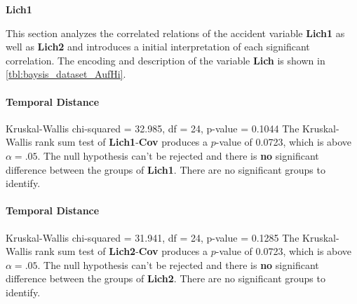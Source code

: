 \Large
\centerline{\textbf{Lich1}}
\normalsize
This section analyzes the correlated relations of the accident variable \textbf{Lich1} as well as \textbf{Lich2} and introduces a initial interpretation of each significant correlation. The encoding and description of the variable \textbf{Lich} is shown in \cref{tbl:baysis_dataset_AufHi}.

\paragraph{Temporal Distance}
Kruskal-Wallis chi-squared = 32.985, df = 24, p-value = 0.1044
The Kruskal-Wallis rank sum test of \textbf{Lich1}-\textbf{Cov} produces a $p$-value of 0.0723, which is above $\alpha=.05$. The null hypothesis can't be rejected and there is \textbf{no} significant difference between the groups of \textbf{Lich1}. There are no significant groups to identify.

\paragraph{Temporal Distance}
Kruskal-Wallis chi-squared = 31.941, df = 24, p-value = 0.1285
The Kruskal-Wallis rank sum test of \textbf{Lich2}-\textbf{Cov} produces a $p$-value of 0.0723, which is above $\alpha=.05$. The null hypothesis can't be rejected and there is \textbf{no} significant difference between the groups of \textbf{Lich2}. There are no significant groups to identify.

